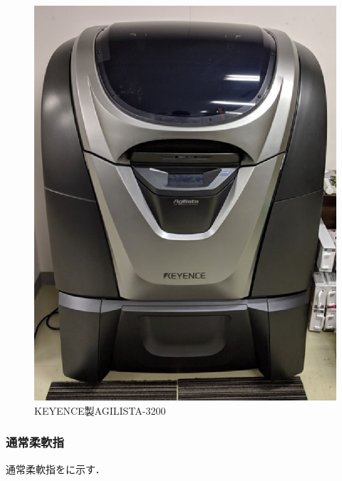 \begin{figure}[b]
 \begin{center}
  \includegraphics[scale=0.4]{../fig/eps/agilista.eps}
 \caption{KEYENCE製AGILISTA-3200}
  \label{fig::agilista}
 \end{center}
\end{figure}

\subsubsection{通常柔軟指}
通常柔軟指をに示す．

